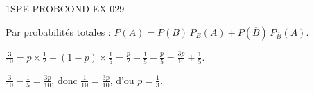 \begin{corrige}{1SPE-PROBCOND-EX-029}

Par probabilités totales : $P(A) = P(B)\,P_B(A) + P(\overline{B})\,P_{\overline{B}}(A)$.

$\frac{3}{10} = p \times \frac{1}{2} + (1-p) \times \frac{1}{5} = \frac{p}{2} + \frac{1}{5} - \frac{p}{5} = \frac{3p}{10} + \frac{1}{5}$.

$\frac{3}{10} - \frac{1}{5} = \frac{3p}{10}$, donc $\frac{1}{10} = \frac{3p}{10}$, d'ou $p = \frac{1}{3}$.

\end{corrige}
